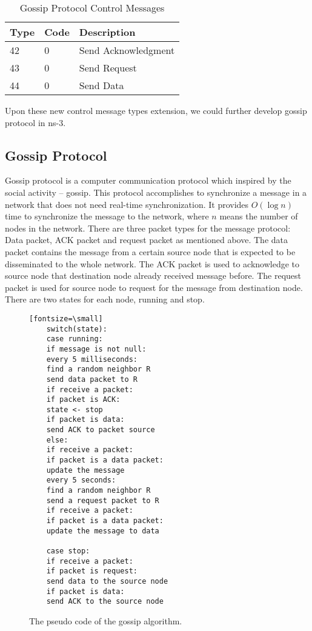 \begin{table}[h]
	\centering
	\caption{Gossip Protocol Control Messages}
	\label{table:3}
	\begin{tabular}{|p{0.8cm}|p{0.5 cm}|p{3.5 cm}|}
		\hline
		Type & Code & Description \\                                                           
		\hline
		42  & 0   & Send Acknowledgment   \\ \hline
		43  &  0 & Send Request \\ 
		\hline
		44 & 0 & Send Data \\
		\hline
	\end{tabular}
\end{table}

Upon these new control message types extension, we could further develop gossip protocol in ns-3.

\subsection{Gossip Protocol}

Gossip protocol is a computer communication protocol which inspired by the social activity -- gossip. This protocol accomplishes to synchronize a message in a network that does not need real-time synchronization. It provides $O(\log n)$ time to synchronize the message to the network, where $n$ means the number of nodes in the network. There are three packet types for the message protocol: Data packet, ACK packet and request packet as mentioned above. The data packet contains the message from a certain source node that is expected to be disseminated to the whole network. The ACK packet is used to acknowledge to source node that destination node already received message before. The request packet is used for source node to request for the message from destination node. There are two states for each node, running and stop.

\begin{figure}
	\centering
	\begin{verbatim}[fontsize=\small]
	switch(state):
	case running:
	if message is not null:
	every 5 milliseconds:
	find a random neighbor R
	send data packet to R
	if receive a packet:
	if packet is ACK:
	state <- stop
	if packet is data:
	send ACK to packet source
	else:
	if receive a packet:
	if packet is a data packet:
	update the message
	every 5 seconds:
	find a random neighbor R
	send a request packet to R
	if receive a packet:
	if packet is a data packet:
	update the message to data
	
	case stop:
	if receive a packet:
	if packet is request:
	send data to the source node
	if packet is data:
	send ACK to the source node
	\end{verbatim}
	\caption{The pseudo code of the gossip algorithm.}
	\label{fig:pseudo}
\end{figure}

